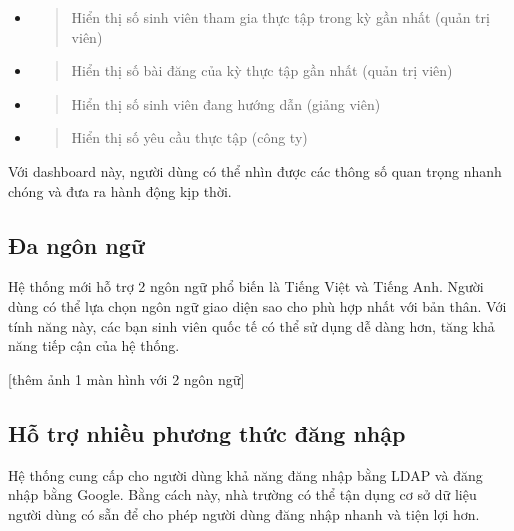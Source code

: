 \documentclass[./../main.tex]{subfiles}
\begin{document}
\begin{itemize}
\item
  \begin{quote}
  Hiển thị số sinh viên tham gia thực tập trong kỳ gần nhất (quản trị
  viên)
  \end{quote}
\item
  \begin{quote}
  Hiển thị số bài đăng của kỳ thực tập gần nhất (quản trị viên)
  \end{quote}
\item
  \begin{quote}
  Hiển thị số sinh viên đang hướng dẫn (giảng viên)
  \end{quote}
\item
  \begin{quote}
  Hiển thị số yêu cầu thực tập (công ty)
  \end{quote}
\end{itemize}

Với dashboard này, người dùng có thể nhìn được các thông số quan trọng
nhanh chóng và đưa ra hành động kịp thời.

\hypertarget{ux111a-nguxf4n-ngux1eef-1}{%
\subsection{Đa ngôn ngữ}\label{ux111a-nguxf4n-ngux1eef-1}}

Hệ thống mới hỗ trợ 2 ngôn ngữ phổ biến là Tiếng Việt và Tiếng Anh.
Người dùng có thể lựa chọn ngôn ngữ giao diện sao cho phù hợp nhất với
bản thân. Với tính năng này, các bạn sinh viên quốc tế có thể sử dụng dễ
dàng hơn, tăng khả năng tiếp cận của hệ thống.

{[}thêm ảnh 1 màn hình với 2 ngôn ngữ{]}

\hypertarget{hux1ed7-trux1ee3-nhiux1ec1u-phux1b0ux1a1ng-thux1ee9c-ux111ux103ng-nhux1eadp}{%
\subsection{Hỗ trợ nhiều phương thức đăng
nhập}\label{hux1ed7-trux1ee3-nhiux1ec1u-phux1b0ux1a1ng-thux1ee9c-ux111ux103ng-nhux1eadp}}

Hệ thống cung cấp cho người dùng khả năng đăng nhập bằng LDAP và đăng
nhập bằng Google. Bằng cách này, nhà trường có thể tận dụng cơ sở dữ
liệu người dùng có sẵn để cho phép người dùng đăng nhập nhanh và tiện
lợi hơn.
\end{document}
